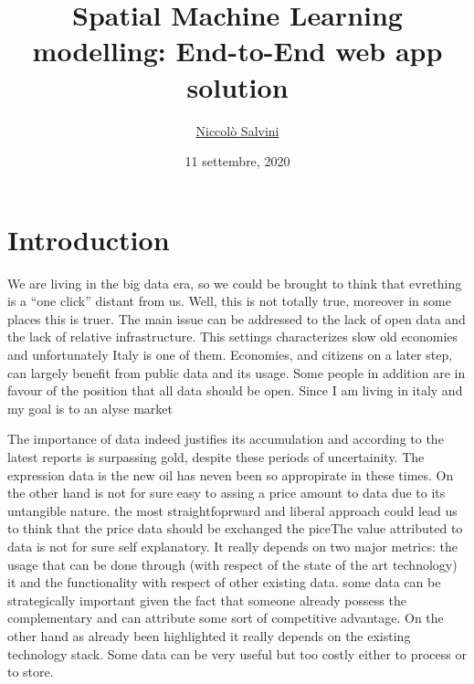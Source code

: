 \documentclass[
  12pt,
  a4paper,
  oneside]{book}
\title{Spatial Machine Learning modelling: End-to-End web app solution}
\author{\href{https://niccolosalvini.netlify.app/}{Niccolò Salvini}}
\date{11 settembre, 2020}
\let\oldmaketitle\maketitle
\begin{document}
\maketitle


\newpage

\let\maketitle\oldmaketitle
\maketitle

{
\setcounter{tocdepth}{1}
\tableofcontents
}
\hypertarget{intro}{%
\chapter{Introduction}\label{intro}}

We are living in the big data era, so we could be brought to think that evrething is a ``one click'' distant from us. Well, this is not totally true, moreover in some places this is truer. The main issue can be addressed to the lack of open data and the lack of relative infrastructure. This settings characterizes slow old economies and unfortunately Italy is one of them. Economies, and citizens on a later step, can largely benefit from public data and its usage. Some people in addition are in favour of the position that all data should be open.
Since I am living in italy and my \citep{lovelace_geocomputation_2019} goal is to an \citep{R-furrr} alyse market

The importance of data indeed justifies its accumulation and according to the latest reports is surpassing gold, despite these periods of uncertainity. The expression data is the new oil has neven been so appropirate in these times.
On the other hand is not for sure easy to assing a price amount to data due to its untangible nature.
the most straightfoprward and liberal approach could lead us to think that the price data should be exchanged the piceThe value attributed to data is not for sure self explanatory. It really depends on two major metrics: the usage that can be done through (with respect of the state of the art technology) it and the functionality with respect of other existing data. some data can be strategically important given the fact that someone already possess the complementary and can attribute some sort of competitive advantage. On the other hand as already been highlighted it really depends on the existing technology stack. Some data can be very useful but too costly either to process or to store.
\end{document}
